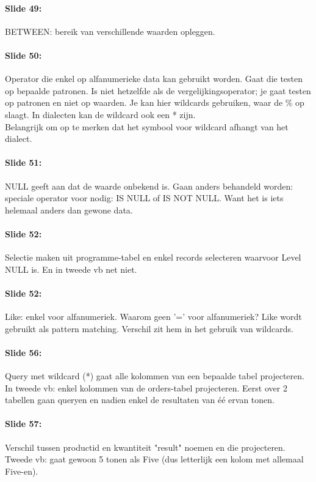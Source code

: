 \documentclass[10pt,a4paper]{report}
\begin{document}
\paragraph{Slide 49:}BETWEEN: bereik van verschillende waarden opleggen.

\paragraph{Slide 50:}Operator die enkel op alfanumerieke data kan gebruikt worden. Gaat die testen op bepaalde patronen. Is niet hetzelfde als de vergelijkingsoperator; je gaat testen op patronen en niet op waarden. Je kan hier wildcards gebruiken, waar de \% op slaagt. In dialecten kan de wildcard ook een * zijn.\\
Belangrijk om op te merken dat het symbool voor wildcard afhangt van het dialect.

\paragraph{Slide 51:}NULL geeft aan dat de waarde onbekend is. Gaan anders behandeld worden: speciale operator voor nodig: IS NULL of IS NOT NULL. Want het is iets helemaal anders dan gewone data. 

\paragraph{Slide 52:}Selectie maken uit programme-tabel en enkel records selecteren waarvoor Level NULL is. En in tweede vb net niet.

\paragraph{Slide 52:}Like: enkel voor alfanumeriek. Waarom geen '=' voor alfanumeriek? Like wordt gebruikt als pattern matching. Verschil zit hem in het gebruik van wildcards.

\paragraph{Slide 56:}Query met wildcard (*) gaat alle kolommen van een bepaalde tabel projecteren. In tweede vb: enkel kolommen van de orders-tabel projecteren. Eerst over 2 tabellen gaan queryen en nadien enkel de resultaten van \'e\'e ervan tonen.

\paragraph{Slide 57:}Verschil tussen productid en kwantiteit "result" noemen en die projecteren. Tweede vb: gaat gewoon 5 tonen als Five (dus letterlijk een kolom met allemaal Five-en).
\end{document}
